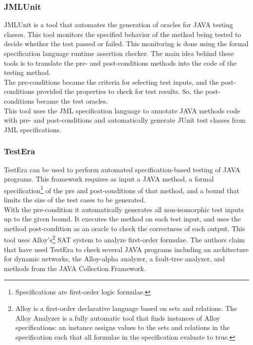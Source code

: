 \documentclass[a4paper,UKenglish]{oasics}
\begin{document}
\subsubsection{JMLUnit}
JMLUnit\cite{Cheon04thejml} is a tool that automates the generation of oracles for JAVA testing classes. This tool
monitors the specified behavior of the method being tested to decide whether the test passed or failed.
This monitoring is done using the formal specification language runtime assertion checker.
The main idea behind these tools is to translate the pre- and post-conditions methods into the code of the testing method.\\
The pre-conditions became the criteria for selecting test inputs, and the post-conditions provided the properties to check for
test results. So, the post-conditions became the test oracles.\\
This tool uses the JML\cite{Burdy03anoverview} specification language to annotate JAVA methods code with pre- and post-conditions and
automatically generate JUnit test classes from JML specifications.

\subsubsection{TestEra}
TestEra\cite{testera} can be used to perform automated specification-based testing of
JAVA programs. This framework requires as input a JAVA method, a formal specification\footnote{Specifications are first-order logic formulae.}
of the pre and post-conditions of that method, and a bound that limits the size of the test cases to be generated.\\
With the pre-condition it automatically generates all non-isomorphic test inputs up to the given bound.
It executes the method on each test input, and uses the method post-condition as an oracle to check the correctness of each output. This tool
uses Alloy's\footnote{Alloy is a first-order declarative language based on sets and relations. The Alloy Analyzer is a fully
automatic tool that finds instances of Alloy specifications: an instance
assigns values to the sets and relations in the specification such that
all formulae in the specification evaluate to true.} SAT system to analyze first-order  formulae.
The authors claim that have used TestEra to check several JAVA programs including an architecture for
dynamic networks, the Alloy-alpha analyzer, a fault-tree analyzer, and methods from the JAVA Collection Framework.
\end{document}
